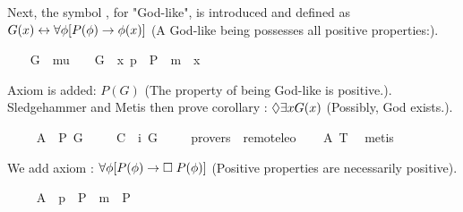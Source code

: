 \begin{isabellebody}
\begin{isamarkuptext}%
Next, the symbol , for "God-like", is introduced and defined 
as $G(x) \leftrightarrow \forall \phi [P(\phi) \to \phi(x)]$ (A God-like being possesses 
all positive properties:).%
\end{isamarkuptext}%
\isamarkuptrue%
\ \ \isamarkupfalse%
\ G\ {\isacharcolon}{\isacharcolon}\ {\isachardoublequoteopen}mu\ {\isasymRightarrow}\ {\isasymsigma}{\isachardoublequoteclose}\ \ {\isachardoublequoteopen}G\ {\isacharequal}\ {\isacharparenleft}{\isasymlambda}x{\isachardot}\ {\isasymforall}p\ {\isacharparenleft}{\isasymlambda}{\isasymPhi}{\isachardot}\ P\ {\isasymPhi}\ m{\isasymRightarrow}\ {\isasymPhi}\ x{\isacharparenright}{\isacharparenright}{\isachardoublequoteclose}%
\begin{isamarkuptext}%
Axiom  is added: $P(G)$ (The property of being God-like is positive.).
Sledgehammer and Metis then prove corollary : $\Diamond \exists x G(x)$ 
(Possibly, God exists.).%
\end{isamarkuptext}%
\isamarkuptrue%
\ \ \isamarkupfalse%
\ \ A{}{\isacharcolon}\ \ {\isachardoublequoteopen}{\isacharbrackleft}P\ G{\isacharbrackright}{\isachardoublequoteclose}\ \isanewline
\isanewline
\ \ \isamarkupfalse%
\ C{\isacharcolon}\ {\isachardoublequoteopen}{\isacharbrackleft}{\isasymdiamond}\ {\isacharparenleft}{\isasymexists}i\ G{\isacharparenright}{\isacharbrackright}{\isachardoublequoteclose}\ \isanewline
\ \ \isamarkupfalse%
\ {\isacharbrackleft}provers\ {\isacharequal}\ remote{\isacharunderscore}leo{}{\isacharbrackright}\isanewline
%
\isadelimproof
\ \ %
\endisadelimproof
%
\isatagproof
{}\isamarkupfalse%
\ A{}\ T{}\ \isamarkupfalse%
\ metis%
\endisatagproof
{\isafoldproof}%
%
\isadelimproof
%
\endisadelimproof
%
\begin{isamarkuptext}%
We add axiom : $\forall \phi [P(\phi) \to \Box \; P(\phi)]$ 
(Positive properties are necessarily positive).%
\end{isamarkuptext}%
\isamarkuptrue%
\ \ \isamarkupfalse%
\ \ A{}{\isacharcolon}\ \ {\isachardoublequoteopen}{\isacharbrackleft}{\isasymforall}p\ {\isacharparenleft}{\isasymlambda}{\isasymPhi}{\isachardot}\ P\ {\isasymPhi}\ m{\isasymRightarrow}\ {\isasymbox}\ {\isacharparenleft}P\ {\isasymPhi}{\isacharparenright}{\isacharparenright}{\isacharbrackright}{\isachardoublequoteclose}%

\end{isabellebody}

